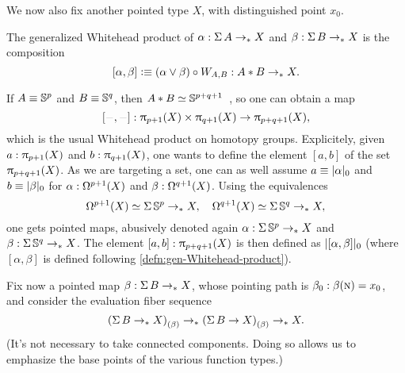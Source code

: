 \documentclass[english,a4paper]{lmcs}
\begin{document}
We now also fix another pointed type $X$, with distinguished point $x_0$.
\begin{defi}
  \label{defn:gen-Whitehead-product}
  The generalized Whitehead product of $\alpha : \operatorname{\Sigma} A \to_\ast X$
  and $\beta : \operatorname{\Sigma} B \to_\ast X$
  is the composition
  \[
    [\alpha, \beta] \vcentcolon\equiv (\alpha \vee \beta) \circ W_{A,B}
    : A * B \to_\ast X.
  \]
\end{defi}
If $A\equiv {\mathbb S^{p}}$ and $B\equiv{\mathbb S^{q}}$,
then $A * B \simeq {\mathbb S^{p+q+1}}$~\cite[Prop.~1.8.8]{brunerie:thesis},
so one can obtain a map
\begin{equation}\label{eq:whitehead-product}
  [\blank,\blank] : \hgr {p+1}(X) \times \hgr {q+1}(X) \to \hgr{p+q+1}(X),
\end{equation}
which is the usual Whitehead product on homotopy groups. Explicitely, given
$a:\uppi_{p+1} (X)$ and $b:\uppi_{q+1} (X)$, one wants to define the element
$[a,b]$ of the set $\uppi_{p+q+1} (X)$. As we are targeting a set, one can as
well assume $a \equiv \lvert\alpha\rvert_0$ and $b \equiv \lvert\beta\rvert_0$ for
$\alpha:\mathop{\Omega^{p+1}}(X)$ and $\beta:\mathop{\Omega^{q+1}}(X)$. Using the
equivalences
\begin{equation}
  \mathop{\Omega^{p+1}}(X) \simeq \operatorname{\Sigma}{\mathbb S^{p}} \to_\ast X, \quad
  \mathop{\Omega^{q+1}}(X) \simeq \operatorname{\Sigma}{\mathbb S^{q}} \to_\ast X,
  \label{eq:equiv-loopspace-map-from-sphere-whitehead}
\end{equation}
one gets pointed maps, abusively denoted again $\alpha: \operatorname{\Sigma} {\mathbb S^{p}} \to_\ast
X$ and $\beta: \operatorname{\Sigma} {\mathbb S^{q}} \to_\ast X$. The element $[a,b] : \uppi_{p+q+1}(X)$ is then
defined as $\lvert[\alpha,\beta]\rvert_0$ (where $[\alpha, \beta]$ is defined
following \cref{defn:gen-Whitehead-product}).

Fix now a pointed map $\beta : \operatorname{\Sigma} B \to_\ast X$, whose pointing path is
$\beta_0:\beta(\textsc{n}) = x_0$, and consider the evaluation fiber sequence
\[
  {(\operatorname{\Sigma} B \to_\ast X)}_{\left(\beta\right)}
  \to_\ast {(\operatorname{\Sigma}B \to X)}_{\left(\beta\right)}
  \to_\ast X.
\]
(It's not necessary to take connected components.
Doing so allows us to emphasize the base points of the various function types.)
\end{document}
